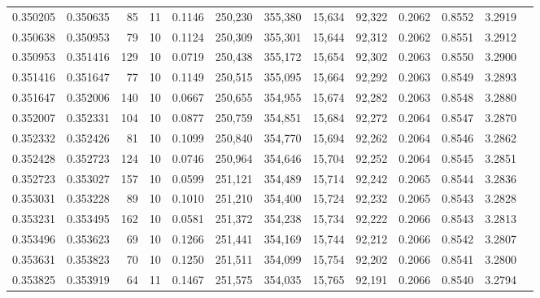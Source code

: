\begin{tabular}{rrrrrrrrrrrrr}
0.350205 & 0.350635 &    85 &  11 &                                     0.1146 & 250,230 & 355,380 &  15,634 &  92,322 & 0.2062 & 0.8552 & 3.2919 \\
0.350638 & 0.350953 &    79 &  10 &                                     0.1124 & 250,309 & 355,301 &  15,644 &  92,312 & 0.2062 & 0.8551 & 3.2912 \\
0.350953 & 0.351416 &   129 &  10 &                                     0.0719 & 250,438 & 355,172 &  15,654 &  92,302 & 0.2063 & 0.8550 & 3.2900 \\
0.351416 & 0.351647 &    77 &  10 &                                     0.1149 & 250,515 & 355,095 &  15,664 &  92,292 & 0.2063 & 0.8549 & 3.2893 \\
0.351647 & 0.352006 &   140 &  10 &                                     0.0667 & 250,655 & 354,955 &  15,674 &  92,282 & 0.2063 & 0.8548 & 3.2880 \\
0.352007 & 0.352331 &   104 &  10 &                                     0.0877 & 250,759 & 354,851 &  15,684 &  92,272 & 0.2064 & 0.8547 & 3.2870 \\
0.352332 & 0.352426 &    81 &  10 &                                     0.1099 & 250,840 & 354,770 &  15,694 &  92,262 & 0.2064 & 0.8546 & 3.2862 \\
0.352428 & 0.352723 &   124 &  10 &                                     0.0746 & 250,964 & 354,646 &  15,704 &  92,252 & 0.2064 & 0.8545 & 3.2851 \\
0.352723 & 0.353027 &   157 &  10 &                                     0.0599 & 251,121 & 354,489 &  15,714 &  92,242 & 0.2065 & 0.8544 & 3.2836 \\
0.353031 & 0.353228 &    89 &  10 &                                     0.1010 & 251,210 & 354,400 &  15,724 &  92,232 & 0.2065 & 0.8543 & 3.2828 \\
0.353231 & 0.353495 &   162 &  10 &                                     0.0581 & 251,372 & 354,238 &  15,734 &  92,222 & 0.2066 & 0.8543 & 3.2813 \\
0.353496 & 0.353623 &    69 &  10 &                                     0.1266 & 251,441 & 354,169 &  15,744 &  92,212 & 0.2066 & 0.8542 & 3.2807 \\
0.353631 & 0.353823 &    70 &  10 &                                     0.1250 & 251,511 & 354,099 &  15,754 &  92,202 & 0.2066 & 0.8541 & 3.2800 \\
0.353825 & 0.353919 &    64 &  11 &                                     0.1467 & 251,575 & 354,035 &  15,765 &  92,191 & 0.2066 & 0.8540 & 3.2794 \\

\end{tabular}
